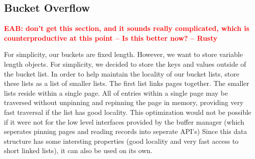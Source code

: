 \documentclass[letterpaper,twocolumn,english]{article}
\newcommand{\yad}{Lemon\xspace}
\newcommand{\eab}[1]{\textcolor{red}{\bf EAB: #1}}
\begin{document}


\subsection{Bucket Overflow}

\eab{don't get this section, and it sounds really complicated, which is counterproductive at this point  -- Is this better now? -- Rusty}

For simplicity, our buckets are fixed length.  However, we want to
store variable length objects.  For simplicity, we decided to store 
the keys and values outside of the bucket list.
In order to help maintain the locality of our bucket lists, store these lists as a list of smaller lists.  The first list links pages together.  The smaller lists reside within a single page.
All of entries within a single page may be traversed without 
unpinning and repinning the page in memory, providing very fast
traversal if the list has good locality.
This optimization would not be possible if it
were not for the low level interfaces provided by the buffer manager
(which seperates pinning pages and reading records into seperate
API's)  Since this data structure has some intersting 
properties (good locality and very fast access to short linked lists), it can also be used on its own.
\end{document}
